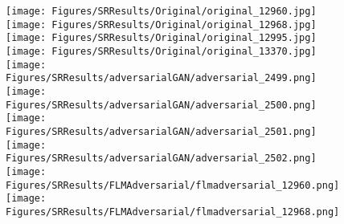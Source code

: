 \documentclass[sn-mathphys]{sn-jnl}%
\theoremstyle{thmstyleone}%
\theoremstyle{thmstyletwo}%
\theoremstyle{thmstylethree}%
\begin{document}
\begin{figure}[t!]
\centering     %
\texttt{[image: Figures/SRResults/Original/original\_12960.jpg]}
\texttt{[image: Figures/SRResults/Original/original\_12968.jpg]}
\texttt{[image: Figures/SRResults/Original/original\_12995.jpg]}
\texttt{[image: Figures/SRResults/Original/original\_13370.jpg]}\\
\texttt{[image: Figures/SRResults/adversarialGAN/adversarial\_2499.png]}
\texttt{[image: Figures/SRResults/adversarialGAN/adversarial\_2500.png]}
\texttt{[image: Figures/SRResults/adversarialGAN/adversarial\_2501.png]}
\texttt{[image: Figures/SRResults/adversarialGAN/adversarial\_2502.png]}\\
\texttt{[image: Figures/SRResults/FLMAdversarial/flmadversarial\_12960.png]}
\texttt{[image: Figures/SRResults/FLMAdversarial/flmadversarial\_12968.png]}

\end{figure}
\end{document}
